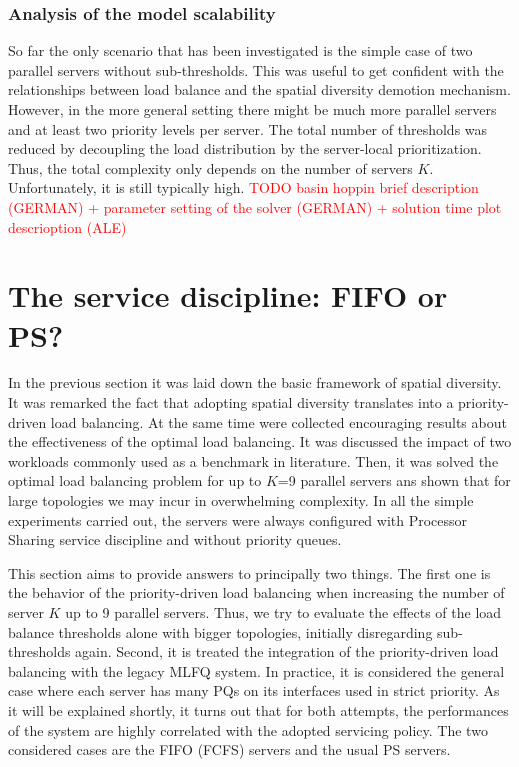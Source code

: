 \subsubsection{Analysis of the model scalability}
So far the only scenario that has been investigated is the simple case of two parallel servers without sub-thresholds. This was useful to get confident with the relationships between load balance and the spatial diversity demotion mechanism. However, in the more general setting there might be much more parallel servers and at least two priority levels per server. The total number of thresholds was reduced by decoupling the load distribution by the server-local prioritization. Thus, the total complexity only depends on the number of servers $K$. Unfortunately, it is still typically high. \textcolor{red}{TODO basin hoppin brief description (GERMAN) + parameter setting of the solver (GERMAN) + solution time plot descrioption (ALE)}
\section{The service discipline: FIFO or PS?}
In the previous section it was laid down the basic framework of spatial diversity. It was remarked the fact that adopting spatial diversity translates into a priority-driven load balancing. At the same time were collected encouraging results about the effectiveness of the optimal load balancing. It was discussed the impact of two workloads commonly used as a benchmark in literature. Then, it was solved the optimal load balancing problem for up to $K$=9 parallel servers ans shown that for large topologies we may incur in overwhelming complexity. In all the simple experiments carried out, the servers were always configured with Processor Sharing service discipline and without priority queues.

This section aims to provide answers to principally two things. The first one is the behavior of the priority-driven load balancing when increasing the number of server $K$ up to 9 parallel servers. Thus, we try to evaluate the effects of the load balance thresholds alone with bigger topologies, initially disregarding sub-thresholds again. Second, it is treated the integration of the priority-driven load balancing with the legacy MLFQ system. In practice, it is considered the general case where each server has many PQs on its interfaces used in strict priority. As it will be explained shortly, it turns out that for both attempts, the performances of the system are highly correlated with the adopted servicing policy. The two considered cases are the FIFO (FCFS) servers and the usual PS servers. 

